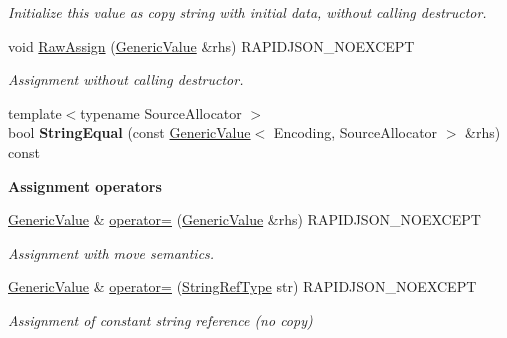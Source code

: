 \begin{DoxyCompactItemize}
\begin{DoxyCompactList}\small\item\em Initialize this value as copy string with initial data, without calling destructor. \end{DoxyCompactList}\item 
void \hyperlink{classGenericValue_abb8ea2dfbe74ff4ee7dac6be31317f81}{Raw\+Assign} (\hyperlink{classGenericValue}{Generic\+Value} \&rhs) R\+A\+P\+I\+D\+J\+S\+O\+N\+\_\+\+N\+O\+E\+X\+C\+E\+PT\hypertarget{classGenericValue_abb8ea2dfbe74ff4ee7dac6be31317f81}{}\label{classGenericValue_abb8ea2dfbe74ff4ee7dac6be31317f81}

\begin{DoxyCompactList}\small\item\em Assignment without calling destructor. \end{DoxyCompactList}\item 
{\footnotesize template$<$typename Source\+Allocator $>$ }\\bool {\bfseries String\+Equal} (const \hyperlink{classGenericValue}{Generic\+Value}$<$ Encoding, Source\+Allocator $>$ \&rhs) const \hypertarget{classGenericValue_a5ff908402687e14f5f14552ec58113a4}{}\label{classGenericValue_a5ff908402687e14f5f14552ec58113a4}

\end{DoxyCompactItemize}
\begin{Indent}{\bf Assignment operators}\par
\begin{DoxyCompactItemize}
\item 
\hyperlink{classGenericValue}{Generic\+Value} \& \hyperlink{classGenericValue_a9018a40d7c52efc00daf803c51d3236c}{operator=} (\hyperlink{classGenericValue}{Generic\+Value} \&rhs) R\+A\+P\+I\+D\+J\+S\+O\+N\+\_\+\+N\+O\+E\+X\+C\+E\+PT
\begin{DoxyCompactList}\small\item\em Assignment with move semantics. \end{DoxyCompactList}\item 
\hyperlink{classGenericValue}{Generic\+Value} \& \hyperlink{classGenericValue_a386708557555e6389184de608af5e6a6}{operator=} (\hyperlink{classGenericValue_a32e0f30ee278072374c8168b14d3317f}{String\+Ref\+Type} str) R\+A\+P\+I\+D\+J\+S\+O\+N\+\_\+\+N\+O\+E\+X\+C\+E\+PT
\begin{DoxyCompactList}\small\item\em Assignment of constant string reference (no copy) \end{DoxyCompactList}\end{DoxyCompactItemize}
\end{Indent}
